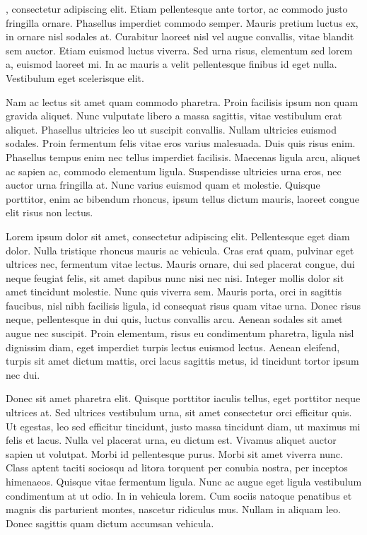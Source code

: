 \documentclass{article}
\begin{document}
\beginnumbering
\autopar

, consectetur adipiscing elit.
 Etiam pellentesque ante tortor, ac commodo justo fringilla ornare.
 Phasellus imperdiet commodo semper.
 Mauris pretium luctus ex, in ornare nisl sodales at.
 Curabitur laoreet nisl vel augue convallis, vitae blandit sem auctor.
 Etiam euismod luctus viverra.
 Sed urna risus, elementum sed lorem a, euismod laoreet mi.
 In ac mauris a velit pellentesque finibus id eget nulla.
 Vestibulum eget scelerisque elit.

 Nam ac lectus sit amet quam commodo pharetra.
 Proin facilisis ipsum non quam gravida aliquet.
 Nunc vulputate libero a massa sagittis, vitae vestibulum erat aliquet.
 Phasellus ultricies leo ut suscipit convallis.
 Nullam ultricies euismod sodales.
 Proin fermentum felis vitae eros varius malesuada.
 Duis quis risus enim.
 Phasellus tempus enim nec tellus imperdiet facilisis.
 Maecenas ligula arcu, aliquet ac sapien ac, commodo elementum ligula.
 Suspendisse ultricies urna eros, nec auctor urna fringilla at.
 Nunc varius euismod quam et molestie.
 Quisque porttitor, enim ac bibendum rhoncus, ipsum tellus dictum mauris, laoreet congue elit risus non lectus.

 
Lorem ipsum dolor sit amet, consectetur adipiscing elit.
 Pellentesque eget diam dolor.
 Nulla tristique rhoncus mauris ac vehicula.
 Cras erat quam, pulvinar eget ultrices nec, fermentum vitae lectus.
 Mauris ornare, dui sed placerat congue, dui neque feugiat felis, sit amet dapibus nunc nisi nec nisi.
 Integer mollis dolor sit amet tincidunt molestie.
 Nunc quis viverra sem.
 Mauris porta, orci in sagittis faucibus, nisl nibh facilisis ligula, id consequat risus quam vitae urna.
 Donec risus neque, pellentesque in dui quis, luctus convallis arcu.
 Aenean sodales sit amet augue nec suscipit.
 Proin elementum, risus eu condimentum pharetra, ligula nisl dignissim diam, eget imperdiet turpis lectus euismod lectus.
 Aenean eleifend, turpis sit amet dictum mattis, orci lacus sagittis metus, id tincidunt tortor ipsum nec dui.

 

Donec sit amet pharetra elit.
 Quisque porttitor iaculis tellus, eget porttitor neque ultrices at.
 Sed ultrices vestibulum urna, sit amet consectetur orci efficitur quis.
 Ut egestas, leo sed efficitur tincidunt, justo massa tincidunt diam, ut maximus mi felis et lacus.
 Nulla vel placerat urna, eu dictum est.
 Vivamus aliquet auctor sapien ut volutpat.
 Morbi id pellentesque purus.
 Morbi sit amet viverra nunc.
 Class aptent taciti sociosqu ad litora torquent per conubia nostra, per inceptos himenaeos.
 Quisque vitae fermentum ligula.
 Nunc ac augue eget ligula vestibulum condimentum at ut odio.
 In in vehicula lorem.
 Cum sociis natoque penatibus et magnis dis parturient montes, nascetur ridiculus mus.
 Nullam in aliquam leo.
 Donec sagittis quam dictum accumsan vehicula.
\end{document}
